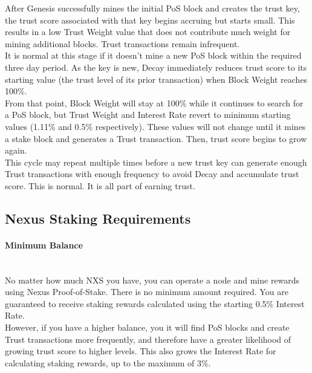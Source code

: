 \documentclass[11pt]{article}
\begin{document}
\noindent After Genesis successfully mines the initial PoS block and creates the trust key, the trust score associated with that key begins accruing but starts small. This results in a low Trust Weight value that does not contribute much weight for mining additional blocks. Trust transactions remain infrequent. \\

\noindent It is normal at this stage if it doesn't mine a new PoS block within the required three day period. As the key is new, Decay immediately reduces trust score to its starting value (the trust level of its prior transaction) when Block Weight reaches 100\%.\\ 

\noindent From that point, Block Weight will stay at 100\% while it continues to search for a PoS block, but Trust Weight and Interest Rate revert to minimum starting values (1.11\% and 0.5\% respectively). These values will not change until it mines a stake block and generates a Trust transaction. Then, trust score begins to grow again.\\

\noindent This cycle may repeat multiple times before a new trust key can generate enough Trust transactions with enough frequency to avoid Decay and accumulate trust score. This is normal. It is all part of earning trust.\\

\subsection{Nexus Staking Requirements}

\paragraph{Minimum Balance} ~\\
No matter how much NXS you have, you can operate a node and mine rewards using Nexus Proof-of-Stake. There is no minimum amount required. You are guaranteed to receive staking rewards calculated using the starting 0.5\% Interest Rate. \\

\noindent However, if you have a higher balance, you it will find PoS blocks and create Trust transactions more frequently, and therefore have a greater likelihood of growing trust score to higher levels. This also grows the Interest Rate for calculating staking rewards, up to the maximum of 3\%.
\end{document}
